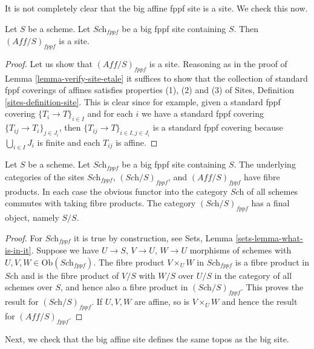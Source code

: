 \noindent
It is not completely clear that
the big affine fppf site is a site. We check this now.

\begin{lemma}
\label{lemma-verify-site-fppf}
Let $S$ be a scheme. Let $\textit{Sch}_{fppf}$ be a big fppf
site containing $S$. Then $(\textit{Aff}/S)_{fppf}$ is a site.
\end{lemma}

\begin{proof}
Let us show that $(\textit{Aff}/S)_{fppf}$ is a site.
Reasoning as in the proof of Lemma \ref{lemma-verify-site-etale}
it suffices to show that the collection
of standard fppf coverings of affines satisfies properties
(1), (2) and (3) of
Sites, Definition \ref{sites-definition-site}.
This is clear since for example, given a standard fppf
covering $\{T_i \to T\}_{i\in I}$ and for each
$i$ we have a standard fppf covering $\{T_{ij} \to T_i\}_{j\in J_i}$, then
$\{T_{ij} \to T\}_{i \in I, j\in J_i}$ is a standard fppf covering
because $\bigcup_{i\in I} J_i$ is finite and each $T_{ij}$ is affine.
\end{proof}

\begin{lemma}
\label{lemma-fibre-products-fppf}
Let $S$ be a scheme. Let $\textit{Sch}_{fppf}$ be a big fppf
site containing $S$. The underlying categories of the sites
$\textit{Sch}_{fppf}$, $(\textit{Sch}/S)_{fppf}$,
and $(\textit{Aff}/S)_{fppf}$ have fibre products.
In each case the obvious functor into the category $\textit{Sch}$ of
all schemes commutes with taking fibre products. The category
$(\textit{Sch}/S)_{fppf}$ has a final object, namely $S/S$.
\end{lemma}

\begin{proof}
For $\textit{Sch}_{fppf}$ it is true by construction, see
Sets, Lemma \ref{sets-lemma-what-is-in-it}.
Suppose we have $U \to S$, $V \to U$, $W \to U$ morphisms
of schemes with $U, V, W \in \text{Ob}(\textit{Sch}_{fppf})$.
The fibre product $V \times_U W$ in $\textit{Sch}_{fppf}$
is a fibre product in $\textit{Sch}$ and
is the fibre product of $V/S$ with $W/S$ over $U/S$ in
the category of all schemes over $S$, and hence also a
fibre product in $(\textit{Sch}/S)_{fppf}$.
This proves the result for $(\textit{Sch}/S)_{fppf}$.
If $U, V, W$ are affine, so is $V \times_U W$ and hence the
result for $(\textit{Aff}/S)_{fppf}$.
\end{proof}

\noindent
Next, we check that the big affine site defines the same
topos as the big site.

